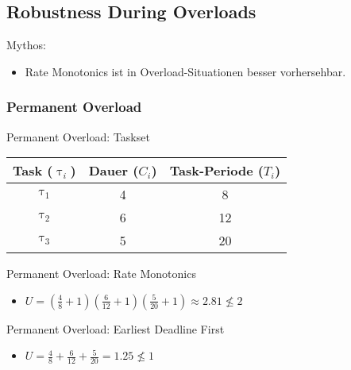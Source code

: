 \subsection{Robustness During Overloads}\label{RobustnessDuringOverloads}

\begin{frame}{Mythos:}
	\begin{itemize}
		\item Rate Monotonics ist in Overload-Situationen besser vorhersehbar.
	\end{itemize}
\end{frame}

\subsubsection{Permanent Overload}
\begin{frame}{Permanent Overload: Taskset}
	\begin{center}
		\begin{tabular}{c||c|c}
			Task ($\uptau_i$) & Dauer ($C_i$) & Task-Periode ($T_i$)\\\hline\hline
			$\uptau_1$ & 4 & 8\\
			$\uptau_2$ & 6 & 12\\
			$\uptau_3$ & 5 & 20
		\end{tabular}
		
	\end{center}
\end{frame}

\begin{frame}{Permanent Overload: Rate Monotonics}
\begin{itemize}
			\item $U=(\frac{4}{8}+1)(\frac{6}{12}+1)(\frac{5}{20}+1)\approx 2.81 \nleq 2$\pause		
		\end{itemize}				

		
\end{frame}

\begin{frame}{Permanent Overload: Earliest Deadline First}
	\begin{center}
		\begin{itemize}
			\item $U=\frac{4}{8}+\frac{6}{12}+\frac{5}{20}=1.25 \nleq 1$\pause		
		\end{itemize}

	
	\end{center}
\end{frame}

